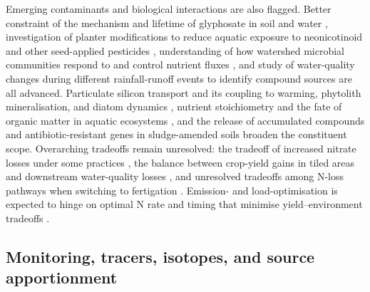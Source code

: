 Emerging contaminants and biological interactions are also flagged. Better constraint of the mechanism and lifetime of glyphosate in soil and water \parencite{Spiese2023}, investigation of planter modifications to reduce aquatic exposure to neonicotinoid and other seed-applied pesticides \parencite{Schaafsma2019}, understanding of how watershed microbial communities respond to and control nutrient fluxes \parencite{Knorr2023}, and study of water-quality changes during different rainfall-runoff events to identify compound sources \parencite{Fraindová2022} are all advanced. Particulate silicon transport and its coupling to warming, phytolith mineralisation, and diatom dynamics \parencite{Sethna2022}, nutrient stoichiometry and the fate of organic matter in aquatic ecosystems \parencite{Manninen2023,Manninen2018}, and the release of accumulated compounds and antibiotic-resistant genes in sludge-amended soils \parencite{Ghirardini2019} broaden the constituent scope. Overarching tradeoffs remain unresolved: the tradeoff of increased nitrate losses under some practices \parencite{Derby2024}, the balance between crop-yield gains in tiled areas and downstream water-quality losses \parencite{Addab2022}, and unresolved tradeoffs among N-loss pathways when switching to fertigation \parencite{Gamble2018}. Emission- and load-optimisation is expected to hinge on optimal N rate and timing that minimise yield--environment tradeoffs \parencite{Emmett2022}.

\subsection{Monitoring, tracers, isotopes, and source apportionment}

